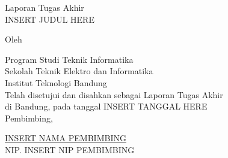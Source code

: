 \clearpage
\pagestyle{empty}

\begin{center}
    \smallskip

    \Large \bfseries \MakeUppercase{\thetitle}
    \vfill

    \Large Laporan Tugas Akhir  \\
    {{INSERT JUDUL HERE}}
    \vfill

    \large Oleh

    \Large \theauthor

    \large Program Studi Teknik Informatika \\

    \normalsize \normalfont
    Sekolah Teknik Elektro dan Informatika \\
    Institut Teknologi Bandung \\

    \vfill
    \normalsize \normalfont
    Telah disetujui dan disahkan sebagai Laporan Tugas Akhir \\
    di Bandung, pada tanggal {{INSERT TANGGAL HERE}} \\

    \vspace{0.3cm}
    Pembimbing,

    \vspace{2cm}
    \underline{{{INSERT NAMA PEMBIMBING}}} \\
    NIP. {{INSERT NIP PEMBIMBING}}

\end{center}
\clearpage
